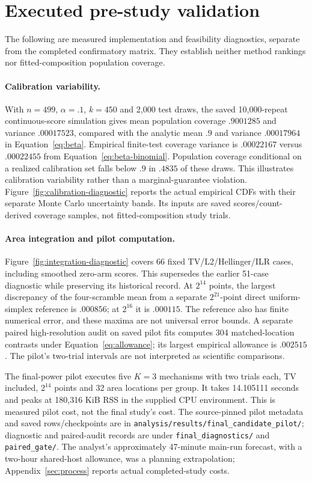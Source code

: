 \section{Executed pre-study validation}
\label{app:diagnostics}
The following are measured implementation and feasibility diagnostics, separate from the completed confirmatory matrix. They establish neither method rankings nor fitted-composition population coverage.

\paragraph{Calibration variability.}
With $n=499$, $\alpha=.1$, $k=450$ and 2,000 test draws, the saved 10,000-repeat continuous-score simulation gives mean population coverage $.9001285$ and variance $.00017523$, compared with the analytic mean $.9$ and variance $.00017964$ in Equation~\eqref{eq:beta}. Empirical finite-test coverage variance is $.00022167$ versus $.00022455$ from Equation~\eqref{eq:beta-binomial}. Population coverage conditional on a realized calibration set falls below $.9$ in $.4835$ of these draws. This illustrates calibration variability rather than a marginal-guarantee violation. Figure~\ref{fig:calibration-diagnostic} reports the actual empirical CDFs with their separate Monte Carlo uncertainty bands. Its inputs are saved scores/count-derived coverage samples, not fitted-composition study trials.

\paragraph{Area integration and pilot computation.}
Figure~\ref{fig:integration-diagnostic} covers 66 fixed TV/L2/Hellinger/ILR cases, including smoothed zero-arm scores. This supersedes the earlier 51-case diagnostic while preserving its historical record. At $2^{14}$ points, the largest discrepancy of the four-scramble mean from a separate $2^{21}$-point direct uniform-simplex reference is $.000856$; at $2^{16}$ it is $.000115$. The reference also has finite numerical error, and these maxima are not universal error bounds. A separate paired high-resolution audit on saved pilot fits computes 304 matched-location contrasts under Equation~\eqref{eq:allowance}; its largest empirical allowance is $.002515$. The pilot's two-trial intervals are not interpreted as scientific comparisons.

The final-power pilot executes five $K=3$ mechanisms with two trials each, TV included, $2^{14}$ points and 32 area locations per group. It takes 14.105111 seconds and peaks at 180,316 KiB RSS in the supplied CPU environment. This is measured pilot cost, not the final study's cost. The source-pinned pilot metadata and saved rows/checkpoints are in \texttt{analysis/results/final\_candidate\_pilot/}; diagnostic and paired-audit records are under \texttt{final\_diagnostics/} and \texttt{paired\_gate/}. The analyst's approximately 47-minute main-run forecast, with a two-hour shared-host allowance, was a planning extrapolation; Appendix~\ref{sec:process} reports actual completed-study costs.

